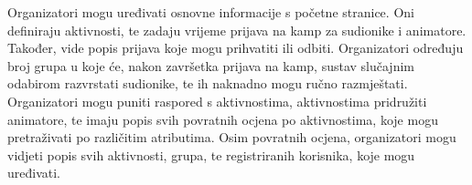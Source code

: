 		Organizatori mogu uređivati osnovne informacije s početne stranice. Oni definiraju aktivnosti, te zadaju vrijeme prijava na kamp za sudionike i animatore. Također, vide popis prijava koje mogu prihvatiti ili odbiti. Organizatori određuju broj grupa u koje će, nakon završetka prijava na kamp, sustav slučajnim odabirom razvrstati sudionike, te ih naknadno mogu ručno razmještati. Organizatori mogu puniti raspored s aktivnostima, aktivnostima pridružiti animatore, te imaju popis svih povratnih ocjena po aktivnostima, koje mogu pretraživati po različitim atributima. Osim povratnih ocjena, organizatori mogu vidjeti popis svih aktivnosti, grupa, te registriranih korisnika, koje mogu uređivati.  
		
		
		\eject
		
		
		
	